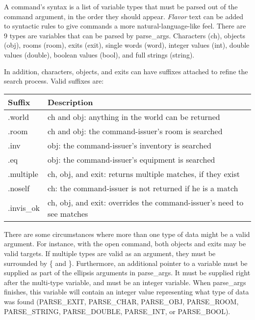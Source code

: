 \documentclass[fignum,doc]{article}
\begin{document}
\begin{doublespace}
A command's syntax is a list of variable types that must be parsed out of the command argument, in the order they should appear. {\it Flavor} text can be added to syntactic rules to give commands a more natural-language-like feel. There are 9 types are variables that can be parsed by parse\_args. Characters (ch), objects (obj), rooms (room), exits (exit), single words (word), integer values (int), double values (double), boolean values (bool), and full strings (string). 

In addition, characters, objects, and exits can have suffixes attached to refine the search process. Valid suffixes are:
\newline \par
\begin{tabular}{|l|l|}
\hline
Suffix & Description \\
\hline
.world & ch and obj: anything in the world can be returned    \\
.room  & ch and obj: the command-issuer's room is searched    \\
.inv   & obj: the command-issuer's inventory is searched      \\
.eq    & obj: the command-issuer's equipment is searched      \\
.multiple & ch, obj, and exit: returns multiple matches, if they exist \\
.noself & ch: the command-issuer is not returned if he is a match \\
.invis\_ok & ch, obj, and exit: overrides the command-issuer's need to see matches \\
\hline
\end{tabular}
\newline \par
\noindent There are some circumstances where more than one type of data might be a valid argument. For instance, with the open command, both objects and exits may be valid targets. If multiple types are valid as an argument, they must be surrounded by \{ and \}. Furthermore, an additional pointer to a variable must be supplied as part of the ellipsis arguments in parse\_args. It must be supplied right after the multi-type variable, and must be an integer variable. When parse\_args finishes, this variable will contain an integer value representing what type of data was found (PARSE\_EXIT, PARSE\_CHAR, PARSE\_OBJ, PARSE\_ROOM, PARSE\_STRING, PARSE\_DOUBLE, PARSE\_INT, or PARSE\_BOOL).


\end{doublespace}
\end{document}
